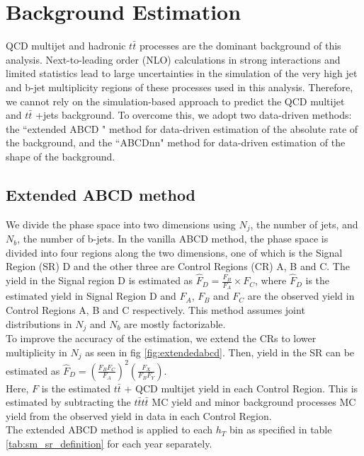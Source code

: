 \documentclass[twoside]{article}
\begin{document}
\section{Background Estimation}
QCD multijet and hadronic $t\bar{t}$ processes are the dominant background of this analysis. Next-to-leading order (NLO) calculations in strong interactions and limited statistics lead to large uncertainties in the simulation of the very high jet and b-jet multiplicity regions of these processes used in this analysis. Therefore, we cannot rely on the simulation-based approach to predict the QCD multijet and $t\bar{t}$ +jets background. To overcome this, we adopt two data-driven methods: the ``extended ABCD " method for data-driven estimation of the absolute rate of the background, and the ``ABCDnn" method for data-driven estimation of the shape of the background.\\

\subsection{Extended ABCD method}
We divide the phase space into two dimensions using $N_j$, the number of jets, and $N_b$, the number of b-jets. In the vanilla ABCD method, the phase space is divided into four regions along the two dimensions, one of which is the Signal Region (SR) D and the other three are Control Regions (CR) A, B and C. The yield in the Signal region D is estimated as $\hat{F}_D = \frac{F_B}{F_A} \times F_C$, where $\hat{F}_D$ is the estimated yield in Signal Region D and $F_A$, $F_B$ and $F_C$ are the observed yield in Control Regions A, B and C respectively. This method assumes joint distributions in $N_j$ and $N_b$ are mostly factorizable.\\

To improve the accuracy of the estimation, we extend the CRs to lower multiplicity in $N_j$ as seen in fig \ref{fig:extendedabcd}. Then, yield in the SR can be estimated as $\hat{F}_D = \left( \frac{F_B F_C}{F_A} \right)^2 \left( \frac{F_X}{F_B F_Y} \right)$.\\ Here, $F$ is the estimated $t\bar{t}$ + QCD multijet yield in each Control Region. This is estimated by subtracting the $t\bar{t}t\bar{t}$ MC yield and minor background processes MC yield from the observed yield in data in each Control Region.\\

The extended ABCD method is applied to each $h_T$ bin as specified in table \ref{tab:sm_sr_definition} for each year separately.\\
\end{document}

